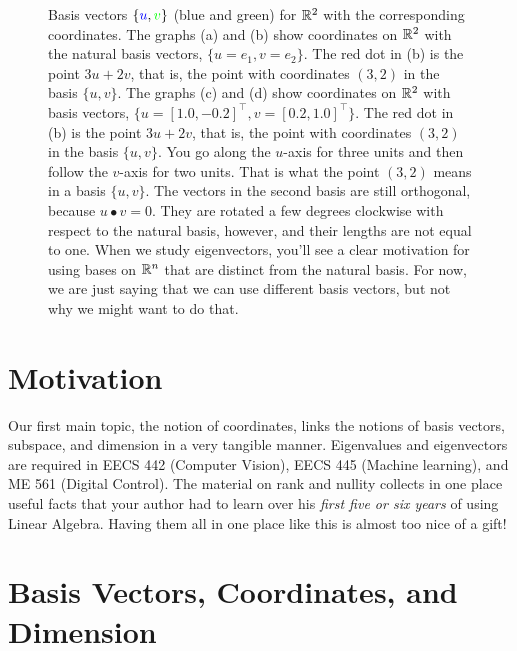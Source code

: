 \begin{figure}[h]
    \caption[]{Basis vectors $\{ \textcolor{blue}{u}, \textcolor{green}{v}\}$ (blue and green) for $\mathbb R^2$ with the corresponding coordinates. The graphs (a) and (b) show coordinates on $\mathbb R^2$ with the natural basis vectors, $\{u=e_1, v=e_2 \}$. The red dot in (b) is the point $3 u + 2 v$, that is, the point with coordinates $(3,2)$ in the basis $\{u, v \}.$  The graphs (c) and (d) show coordinates on $\mathbb R^2$ with basis vectors, $\{u=[1.0, -0.2 ]^\top, v= [0.2, 1.0]^\top \}$. The red dot in (b) is the point $3 u + 2 v$, that is, the point with coordinates $(3, 2)$ in the basis $\{u, v \}$. You go along the $u$-axis for three units and then follow the $v$-axis for two units. That is what the point $(3,2)$ means in a basis  $\{u, v \}.$ The vectors in the second basis are still orthogonal, because $ u \bullet v = 0$. They are rotated a few degrees clockwise with respect to the natural basis, however, and their lengths are not equal to one. When we study eigenvectors, you'll see a clear motivation for using bases on $\mathbb R^n$ that are distinct from the natural basis. For now, we are just saying that we can use different basis vectors, but not why we might want to do that.
    }
    \label{fig:R2BasisVectors}
\end{figure}


\section{Motivation}
Our first main topic, the notion of coordinates, links the notions of basis vectors, subspace, and dimension in a very tangible manner. 
 Eigenvalues and eigenvectors are required in EECS 442 (Computer Vision), EECS 445 (Machine learning), and ME 561 (Digital Control). The material on rank and nullity collects in one place useful facts that your author had to learn over his \textit{first five or six years} of using Linear Algebra. Having them all in one place like this is almost too nice of a gift! 


\section{Basis Vectors, Coordinates, and Dimension}
\label{sec:BasisCoordinatesDimension}


